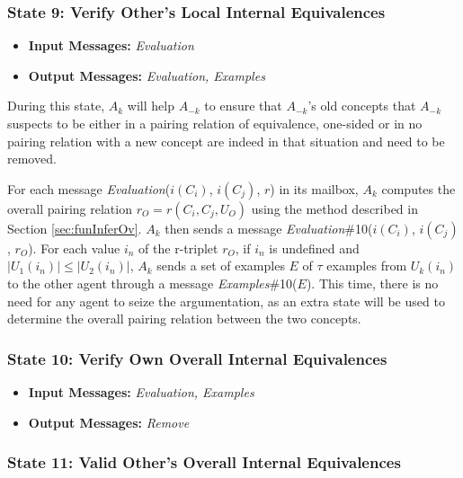 \subsubsection{State 9: Verify Other's Local Internal Equivalences}

\begin{itemize}
    \item \textbf{Input Messages:} \emph{Evaluation}
    \item \textbf{Output Messages:} \emph{Evaluation, Examples}
\end{itemize}

During this state, $A_{k}$ will help $A_{-k}$ to ensure that $A_{-k}$'s old concepts that $A_{-k}$ suspects to be either in a pairing relation of equivalence, one-sided or in no pairing relation with a new concept are indeed in that situation and need to be removed.

For each message \emph{Evaluation}($i(C_{i})$, $i(C_{j})$, $r$) in its mailbox, $A_{k}$ computes the overall pairing relation $r_{O} =  r(C_{i}, C_{j}, U_{O})$ using the method described in Section \ref{sec:funInferOv}. $A_{k}$ then sends a message \emph{Evaluation}\#10($i(C_{i})$, $i(C_{j})$, $r_{O}$). For each value $i_{n}$ of the r-triplet $r_{O}$, if $i_{n}$ is undefined and $|U_{1}(i_{n})| \leq |U_{2}(i_{n})|$, $A_{k}$ sends a set of examples $E$ of $\tau$ examples from $U_{k}(i_{n})$ to the other agent through a message \emph{Examples}\#10($E$). This time, there is no need for any agent to seize the argumentation, as an extra state will be used to determine the overall pairing relation between the two concepts.


\subsubsection{State 10: Verify Own Overall Internal Equivalences}

\begin{itemize}
    \item \textbf{Input Messages:} \emph{Evaluation, Examples}
    \item \textbf{Output Messages:} \emph{Remove}
\end{itemize}



\subsubsection{State 11: Valid Other's Overall Internal Equivalences}

